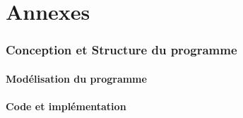 \documentclass[12pt,a4paper]{article}
\begin{document}
	 
	
	
	\newpage
	
	\appendix
	\part*{Annexes}
		
	\section{Conception et Structure du programme}
	\subsection{Modélisation du programme}
	\subsection{Code et implémentation}
	
\end{document}
